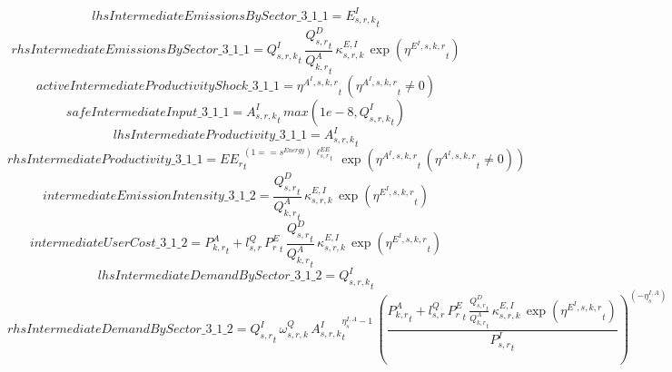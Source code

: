 \begin{dmath*}
lhsIntermediateEmissionsBySector\_3\_1\_1 = {{E^I_{s,r,k}}}_{t}
\end{dmath*}
\begin{dmath*}
rhsIntermediateEmissionsBySector\_3\_1\_1 = {{Q^{I}_{s,r,k}}}_{t}\, \frac{{{Q^{D}_{s,r}}}_{t}}{{{Q^{A}_{k,r}}}_{t}}\, {{\kappa^{E,I}_{s,r,k}}}\, \exp\left({{\eta^{E^{I},s,k,r}}}_{t}\right)
\end{dmath*}
\begin{dmath*}
activeIntermediateProductivityShock\_3\_1\_1 = {{\eta^{A^{I},s,k,r}}}_{t}\, \left({{\eta^{A^{I},s,k,r}}}_{t}\neq 0\right)
\end{dmath*}
\begin{dmath*}
safeIntermediateInput\_3\_1\_1 = {{A^{I}_{s,r,k}}}_{t}\, max(1e-8,{{Q^{I}_{s,r,k}}}_{t})
\end{dmath*}
\begin{dmath*}
lhsIntermediateProductivity\_3\_1\_1 = {{A^{I}_{s,r,k}}}_{t}
\end{dmath*}
\begin{dmath*}
rhsIntermediateProductivity\_3\_1\_1 = {{EE_r}}_{t}^{\left(1=={{s^{Energy}}}\right)\, {{\ell^{EE}_{s,r}}}_{t}}\, \exp\left({{\eta^{A^{I},s,k,r}}}_{t}\, \left({{\eta^{A^{I},s,k,r}}}_{t}\neq 0\right)\right)
\end{dmath*}
\begin{dmath*}
intermediateEmissionIntensity\_3\_1\_2 = \frac{{{Q^{D}_{s,r}}}_{t}}{{{Q^{A}_{k,r}}}_{t}}\, {{\kappa^{E,I}_{s,r,k}}}\, \exp\left({{\eta^{E^{I},s,k,r}}}_{t}\right)
\end{dmath*}
\begin{dmath*}
intermediateUserCost\_3\_1\_2 = {{P^{A}_{k,r}}}_{t}+{{l^{Q}_{s,r}}}\, {{P^E_r}}_{t}\, \frac{{{Q^{D}_{s,r}}}_{t}}{{{Q^{A}_{k,r}}}_{t}}\, {{\kappa^{E,I}_{s,r,k}}}\, \exp\left({{\eta^{E^{I},s,k,r}}}_{t}\right)
\end{dmath*}
\begin{dmath*}
lhsIntermediateDemandBySector\_3\_1\_2 = {{Q^{I}_{s,r,k}}}_{t}
\end{dmath*}
\begin{dmath*}
rhsIntermediateDemandBySector\_3\_1\_2 = {{Q^{I}_{s,r}}}_{t}\, {{\omega^{Q}_{s,r,k}}}\, {{A^{I}_{s,r,k}}}_{t}^{{{\eta^{I,A}_{s}}}-1}\, \left(\frac{{{P^{A}_{k,r}}}_{t}+{{l^{Q}_{s,r}}}\, {{P^E_r}}_{t}\, \frac{{{Q^{D}_{s,r}}}_{t}}{{{Q^{A}_{k,r}}}_{t}}\, {{\kappa^{E,I}_{s,r,k}}}\, \exp\left({{\eta^{E^{I},s,k,r}}}_{t}\right)}{{{P^{I}_{s,r}}}_{t}}\right)^{\left(-{{\eta^{I,A}_{s}}}\right)}
\end{dmath*}
